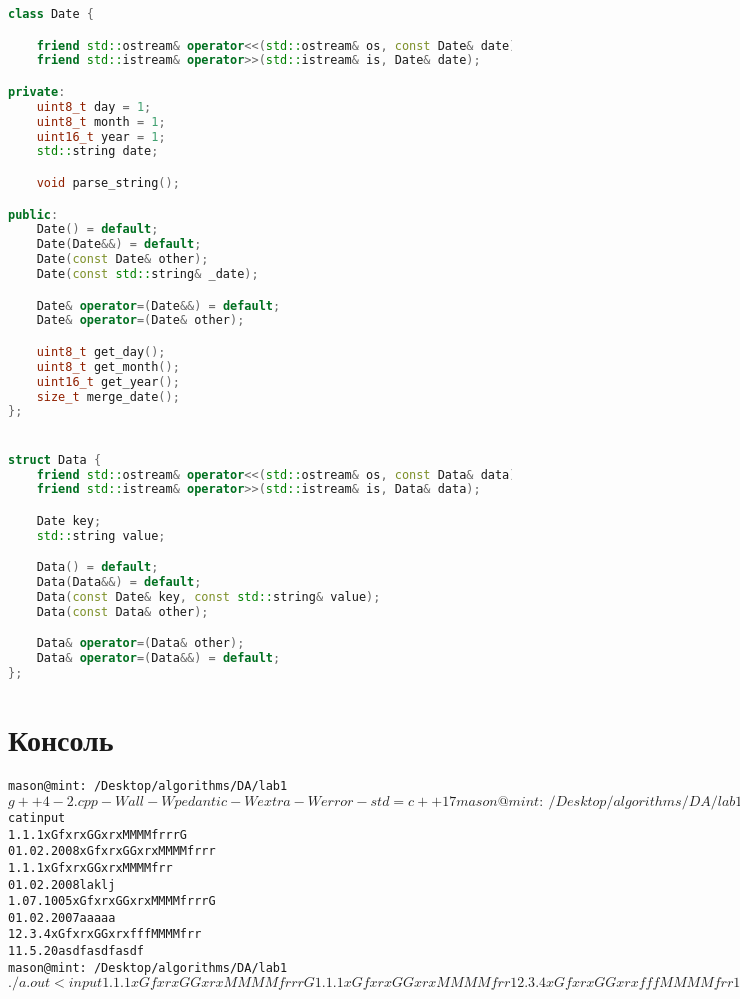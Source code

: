 \begin{lstlisting}[language=C++]
class Date {

    friend std::ostream& operator<<(std::ostream& os, const Date& date);
    friend std::istream& operator>>(std::istream& is, Date& date);

private:
    uint8_t day = 1;
    uint8_t month = 1;
    uint16_t year = 1;
    std::string date;

    void parse_string();

public:
    Date() = default;
    Date(Date&&) = default;
    Date(const Date& other);
    Date(const std::string& _date);

    Date& operator=(Date&&) = default;
    Date& operator=(Date& other);

    uint8_t get_day();
    uint8_t get_month();
    uint16_t get_year();
    size_t merge_date();
};


struct Data {
    friend std::ostream& operator<<(std::ostream& os, const Data& data);
    friend std::istream& operator>>(std::istream& is, Data& data);

    Date key;
    std::string value;

    Data() = default;
    Data(Data&&) = default;
    Data(const Date& key, const std::string& value);
    Data(const Data& other);

    Data& operator=(Data& other);
    Data& operator=(Data&&) = default;
};
\end{lstlisting}
\pagebreak

\section{Консоль}
\begin{alltt}
mason@mint:~/Desktop/algorithms/DA/lab1$ g++ 4-2.cpp -Wall -Wpedantic -Wextra -Werror -std=c++17
mason@mint:~/Desktop/algorithms/DA/lab1$ cat input 
1.1.1   xGfxrxGGxrxMMMMfrrrG
01.02.2008      xGfxrxGGxrxMMMMfrrr
1.1.1   xGfxrxGGxrxMMMMfrr
01.02.2008      laklj
1.07.1005       xGfxrxGGxrxMMMMfrrrG
01.02.2007      aaaaa
12.3.4  xGfxrxGGxrxfffMMMMfrr
11.5.20 asdfasdfasdf
mason@mint:~/Desktop/algorithms/DA/lab1$ ./a.out < input 
1.1.1   xGfxrxGGxrxMMMMfrrrG
1.1.1   xGfxrxGGxrxMMMMfrr
12.3.4  xGfxrxGGxrxfffMMMMfrr
11.5.20 asdfasdfasdf
1.07.1005       xGfxrxGGxrxMMMMfrrrG
01.02.2007      aaaaa
01.02.2008      xGfxrxGGxrxMMMMfrrr
01.02.2008      laklj
mason@mint:~/Desktop/algorithms/DA/lab1$
\end{alltt}
\pagebreak


